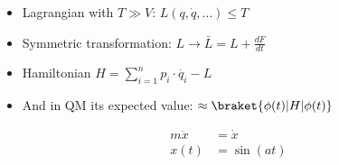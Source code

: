 \begin{itemize} %
	\item Lagrangian with $T \gg V$: $L(q, \dot{q}, \dots ) \leq T$
	\item Symmetric transformation: $L \to \bar L = L + \frac{dF}{dt}$
	\item Hamiltonian $H=\sum_{i=1}^ n p_i \cdot \dot{q_i} - L$
	\item And in QM its expected value: $\approx \braket{\phi(t) | H | \phi(t)}$
\end{itemize}

\begin{align}
  m \ddot{x} &= \dot{x} \\
  x(t)  &= \sin(at)
\end{align}

